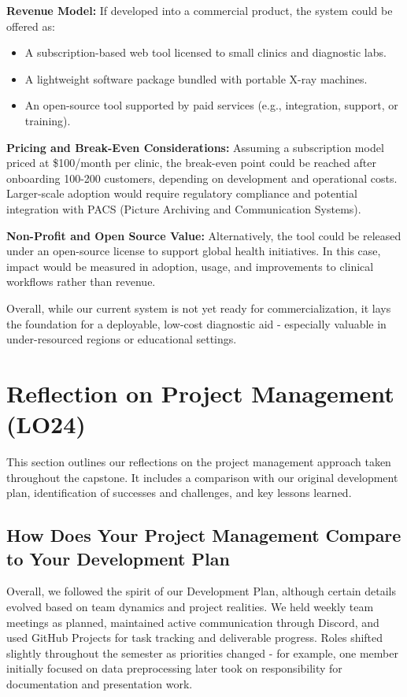 \documentclass{article}
\begin{document}
\textbf{Revenue Model:} If developed into a commercial product, the system could be offered as:
\begin{itemize}
    \item A subscription-based web tool licensed to small clinics and diagnostic labs.
    \item A lightweight software package bundled with portable X-ray machines.
    \item An open-source tool supported by paid services (e.g., integration, support, or training).
\end{itemize}

\textbf{Pricing and Break-Even Considerations:} Assuming a subscription model priced at \$100/month per clinic, the break-even point could be reached after onboarding 100-200 customers, depending on development and operational costs. Larger-scale adoption would require regulatory compliance and potential integration with PACS (Picture Archiving and Communication Systems).

\textbf{Non-Profit and Open Source Value:} Alternatively, the tool could be released under an open-source license to support global health initiatives. In this case, impact would be measured in adoption, usage, and improvements to clinical workflows rather than revenue.

Overall, while our current system is not yet ready for commercialization, it lays the foundation for a deployable, low-cost diagnostic aid - especially valuable in under-resourced regions or educational settings.


\section{Reflection on Project Management (LO24)}

This section outlines our reflections on the project management approach taken throughout the capstone. It includes a comparison with our original development plan, identification of successes and challenges, and key lessons learned.

\subsection{How Does Your Project Management Compare to Your Development Plan}

Overall, we followed the spirit of our Development Plan, although certain details evolved based on team dynamics and project realities. We held weekly team meetings as planned, maintained active communication through Discord, and used GitHub Projects for task tracking and deliverable progress. Roles shifted slightly throughout the semester as priorities changed - for example, one member initially focused on data preprocessing later took on responsibility for documentation and presentation work.
\end{document}
